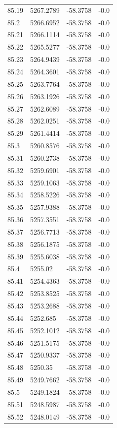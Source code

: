 \begin{table}[H]
\begin{tabular}{llll}
85.19 & 5267.2789 & -58.3758 & -0.0 \\
85.2 & 5266.6952 & -58.3758 & -0.0 \\
85.21 & 5266.1114 & -58.3758 & -0.0 \\
85.22 & 5265.5277 & -58.3758 & -0.0 \\
85.23 & 5264.9439 & -58.3758 & -0.0 \\
85.24 & 5264.3601 & -58.3758 & -0.0 \\
85.25 & 5263.7764 & -58.3758 & -0.0 \\
85.26 & 5263.1926 & -58.3758 & -0.0 \\
85.27 & 5262.6089 & -58.3758 & -0.0 \\
85.28 & 5262.0251 & -58.3758 & -0.0 \\
85.29 & 5261.4414 & -58.3758 & -0.0 \\
85.3 & 5260.8576 & -58.3758 & -0.0 \\
85.31 & 5260.2738 & -58.3758 & -0.0 \\
85.32 & 5259.6901 & -58.3758 & -0.0 \\
85.33 & 5259.1063 & -58.3758 & -0.0 \\
85.34 & 5258.5226 & -58.3758 & -0.0 \\
85.35 & 5257.9388 & -58.3758 & -0.0 \\
85.36 & 5257.3551 & -58.3758 & -0.0 \\
85.37 & 5256.7713 & -58.3758 & -0.0 \\
85.38 & 5256.1875 & -58.3758 & -0.0 \\
85.39 & 5255.6038 & -58.3758 & -0.0 \\
85.4 & 5255.02 & -58.3758 & -0.0 \\
85.41 & 5254.4363 & -58.3758 & -0.0 \\
85.42 & 5253.8525 & -58.3758 & -0.0 \\
85.43 & 5253.2688 & -58.3758 & -0.0 \\
85.44 & 5252.685 & -58.3758 & -0.0 \\
85.45 & 5252.1012 & -58.3758 & -0.0 \\
85.46 & 5251.5175 & -58.3758 & -0.0 \\
85.47 & 5250.9337 & -58.3758 & -0.0 \\
85.48 & 5250.35 & -58.3758 & -0.0 \\
85.49 & 5249.7662 & -58.3758 & -0.0 \\
85.5 & 5249.1824 & -58.3758 & -0.0 \\
85.51 & 5248.5987 & -58.3758 & -0.0 \\
85.52 & 5248.0149 & -58.3758 & -0.0 \\

\end{tabular}
\end{table}
